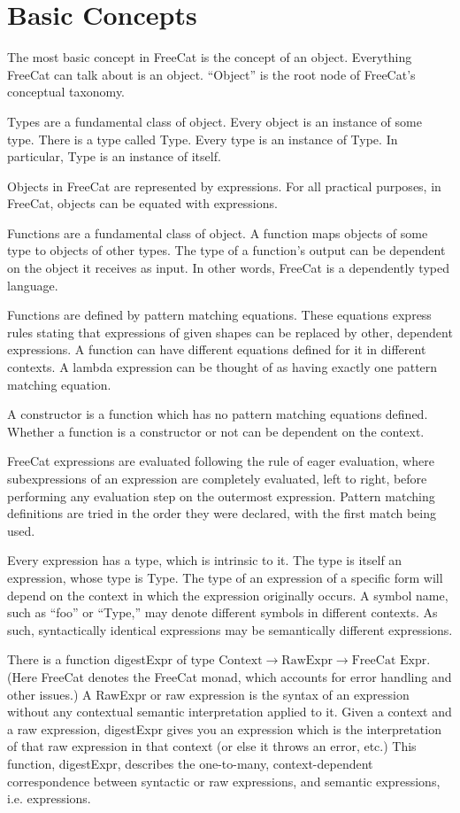 \documentclass{article}
\begin{document}
\section{Basic Concepts}

The most basic concept in FreeCat is the concept of an object. Everything FreeCat can talk about is an object. ``Object'' is the root node of FreeCat's conceptual taxonomy.

Types are a fundamental class of object. Every object is an instance of some type. There is a type called Type. Every type is an instance of Type. In particular, Type is an instance of itself.

Objects in FreeCat are represented by expressions. For all practical purposes, in FreeCat, objects can be equated with expressions.

Functions are a fundamental class of object. A function maps objects of some type to objects of other types. The type of a function's output can be dependent on the object it receives as input. In other words, FreeCat is a dependently typed language.

Functions are defined by pattern matching equations. These equations express rules stating that expressions of given shapes can be replaced by other, dependent expressions. A function can have different equations defined for it in different contexts. A lambda expression can be thought of as having exactly one pattern matching equation.

A constructor is a function which has no pattern matching equations defined. Whether a function is a constructor or not can be dependent on the context.

FreeCat expressions are evaluated following the rule of eager evaluation, where subexpressions of an expression are completely evaluated, left to right, before performing any evaluation step on the outermost expression. Pattern matching definitions are tried in the order they were declared, with the first match being used.

Every expression has a type, which is intrinsic to it. The type is itself an expression, whose type is Type. The type of an expression of a specific form will depend on the context in which the expression originally occurs. A symbol name, such as ``foo'' or ``Type,'' may denote different symbols in different contexts. As such, syntactically identical expressions may be semantically different expressions.

There is a function digestExpr of type $\text{Context} \to \text{RawExpr} \to \text{FreeCat Expr}$. (Here FreeCat denotes the FreeCat monad, which accounts for error handling and other issues.) A RawExpr or raw expression is the syntax of an expression without any contextual semantic interpretation applied to it. Given a context and a raw expression, digestExpr gives you an expression which is the interpretation of that raw expression in that context (or else it throws an error, etc.) This function, digestExpr, describes the one-to-many, context-dependent correspondence between syntactic or raw expressions, and semantic expressions, i.e. expressions.
\end{document}
